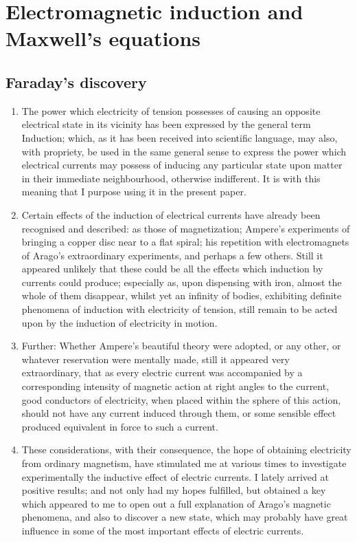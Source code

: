 \chapter[Electromagnetic induction and Maxwell's equations]
      [Electromagnetic induction]{Electromagnetic induction and Maxwell's equations}

\section{Faraday's discovery}

{\small
\begin{enumerate}

\item The power which electricity of tension possesses of causing an opposite
electrical state in its vicinity has been expressed by the general term Induction;
which, as it has been received into scientific language, may also, with
propriety, be used in the same general sense to express the power which
electrical currents may possess of inducing any particular state upon matter
in their immediate neighbourhood, otherwise indifferent. It is with this
meaning that I purpose using it in the present paper.

\item Certain effects of the induction of electrical currents have already been
recognised and described: as those of magnetization; Ampere's experiments
of bringing a copper disc near to a flat spiral; his repetition with electromagnets
of Arago's extraordinary experiments, and perhaps a few others.
Still it appeared unlikely that these could be all the effects which induction
by currents could produce; especially as, upon dispensing with iron, almost
the whole of them disappear, whilst yet an infinity of bodies, exhibiting
definite phenomena of induction with electricity of tension, still remain to
be acted upon by the induction of electricity in motion.

\item Further: Whether Ampere's beautiful theory were adopted, or any
other, or whatever reservation were mentally made, still it appeared very
extraordinary, that as every electric current was accompanied by a corresponding
intensity of magnetic action at right angles to the current, good
conductors of electricity, when placed within the sphere of this action, should
not have any current induced through them, or some sensible effect produced
equivalent in force to such a current.

\item These considerations, with their consequence, the hope of obtaining
electricity from ordinary magnetism, have stimulated me at various times
to investigate experimentally the inductive effect of electric currents. I lately
arrived at positive results; and not only had my hopes fulfilled, but obtained
a key which appeared to me to open out a full explanation of Arago's magnetic
phenomena, and also to discover a new state, which may probably have
great influence in some of the most important effects of electric currents.


\end{enumerate}}
